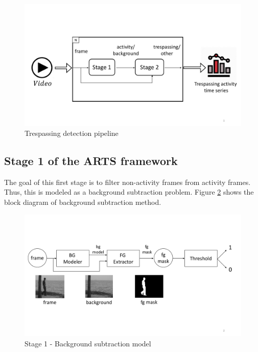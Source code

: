 \begin{figure}
    \centering
    \includegraphics[width=\linewidth,trim={0 110 0 130},clip]{images/trespassing-detection-pipeline}
    \caption{Trespassing detection pipeline}
    \label{fig:trespassing-detection-pipeline}
\end{figure}


\subsection{Stage 1 of the ARTS framework}
\label{sec:stage1}
The goal of this first stage is to filter non-activity frames from activity frames. Thus, this is modeled as a background subtraction problem. Figure \ref{fig:background-subtraction-model} shows the block diagram of background subtraction method. 
\begin{figure}
    \centering
    \includegraphics[width=\linewidth,trim={0 130 0 130},clip]{images/background-subtraction-model}
    \caption{Stage 1 - Background subtraction model}
    \label{fig:background-subtraction-model}
\end{figure}

